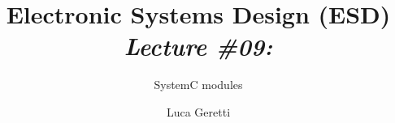 \documentclass{beamer}
\title[ESD \#09]{Electronic Systems Design (ESD) \\ {\em \small Lecture \#09:}}
\subtitle{SystemC modules}
\author{Luca Geretti}
\date{}
\institute{\uppercase{Università degli Studi di Udine}\\\url{luca.geretti@uniud.it}\\\url{https://bitbucket.org/uniud_esd/course}}
\begin{document}
\begin{frame}[plain,t]
\titlepage
\end{frame}


\end{document}
